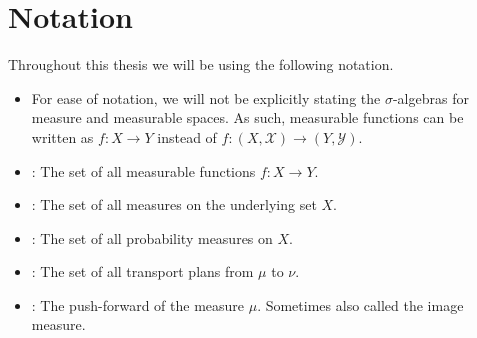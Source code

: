 \chapter*{Notation}

Throughout this thesis we will be using the following notation.

\begin{itemize}
	\item For ease of notation, we will not be explicitly stating the $\sigma$-algebras for measure and measurable spaces. As such, measurable functions can be written as $f: X \rightarrow Y$ instead of $f: (X, \mathcal{X}) \rightarrow (Y, \mathcal{Y})$.
	\item {}: The set of all measurable functions $f: X \rightarrow Y$.
	\item {}: The set of all measures on the underlying set $X$.
	\item {}: The set of all probability measures on $X$.
	\item \TP{\mu}{\nu}: The set of all transport plans from $\mu$ to $\nu$.
	\item \push{\mu}: The push-forward of the measure $\mu$. Sometimes also called the image measure.
\end{itemize}